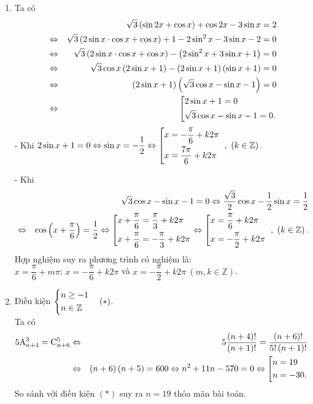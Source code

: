 \begin{bt}
{\begin{enumerate}
		 - Khi $\tan x = - 1\Leftrightarrow x = - \dfrac{3\pi}{4} + m\pi\  \left(m \in \mathbb{Z}\right)$.\\
		  Vậy nghiệm của phương trình là $x = \dfrac{\pi}{6} + m\pi$ và $x = - \dfrac{3\pi}{4} + m\pi\  \left(m \in \mathbb{Z}\right)$ .
			
		\item Ta có 
	\begin{eqnarray*}
			&{  }&\sqrt{3}\left(\sin 2x  + \cos x\right) +  \cos 2x - 3\sin x = 2\\ &\Leftrightarrow &\sqrt{3}\left(2\sin x\cdot\cos x + \cos x\right) + 1 - 2\sin^2x  - 3\sin x  - 2 = 0\\
			&\Leftrightarrow &\sqrt{3}\left(2\sin x\cdot\cos x + \cos x\right)  - \left(2\sin^2x  + 3\sin x  + 1\right) = 0\\
			&\Leftrightarrow &\sqrt{3}\cos x\left(2\sin x + 1\right)  - \left(2\sin x  + 1\right)\left(\sin x  + 1\right) = 0\\
			&\Leftrightarrow &\left(2\sin x + 1\right)\left(\sqrt{3}\cos x - \sin x - 1\right) = 0\\
		&\Leftrightarrow& \left[\begin{aligned}&2\sin x + 1 = 0\\&\sqrt{3}\cos x - \sin x - 1 = 0.\end{aligned}\right.
				\end{eqnarray*}
					- Khi $2\sin x + 1 = 0\Leftrightarrow \sin x = - \dfrac{1}{2}\Leftrightarrow \left[\begin{aligned}&x = -\dfrac{\pi}{6} + k2\pi\\&x = \dfrac{7\pi}{6} + k2\pi\end{aligned}\right.\  ,\ \left(k \in \mathbb{Z}\right)$.
					
					- Khi 
					\begin{eqnarray*}
					&{ }&\sqrt{3}\cos x - \sin x - 1 = 0 \Leftrightarrow \dfrac{\sqrt{3}}{2}\cos x - \dfrac{1}{2}\sin x =  \dfrac{1}{2}\\
					 &\Leftrightarrow &\cos\left(x + \dfrac{\pi}{6}\right) = \dfrac{1}{2}\Leftrightarrow \left[\begin{aligned}&x + \dfrac{\pi}{6} = \dfrac{\pi}{3} + k2\pi\\&x + \dfrac{\pi}{6} = - \dfrac{\pi}{3} + k2\pi\end{aligned}\right.\Leftrightarrow \left[\begin{aligned}&x = \dfrac{\pi}{6} + k2\pi\\&x = - \dfrac{\pi}{2} + k2\pi\end{aligned}\right.\  ,\ \left(k \in \mathbb{Z}\right).
					\end{eqnarray*}
		Hợp nghiệm suy ra phương trình có nghiệm là:\\
		 $x = \dfrac{\pi}{6} + m\pi$; $x = -\dfrac{\pi}{6} + k2\pi$ và $x = - \dfrac{\pi}{2} + k2\pi\  \left(m, k \in \mathbb{Z}\right)$.
		 \item  Điều kiện $\left\{\begin{aligned}&n\geq -1\\&n\in \mathbb{Z}\end{aligned}\right.\quad (*)$.\\
		 Ta có 
		 	\begin{eqnarray*}
		 5\mathrm{A}^{3}_{n + 4} = \mathrm{C}^{5}_{n + 6}&\Leftrightarrow& 5\dfrac{\left(n + 4\right)!}{\left(n + 1\right)!} = \dfrac{\left(n + 6\right)!}{5!\left(n + 1\right)!}\\
		 &\Leftrightarrow& \left(n + 6\right)\left(n + 5\right) = 600\Leftrightarrow n^2 + 11n - 570 = 0\Leftrightarrow\left[\begin{aligned}&n = 19\\&n = - 30.\end{aligned}\right.
		 	\end{eqnarray*}
		 So sánh với điều kiện $(*)$ suy ra $n = 19$ thỏa mãn bài toán.
		 

\end{enumerate}}
\end{bt}
